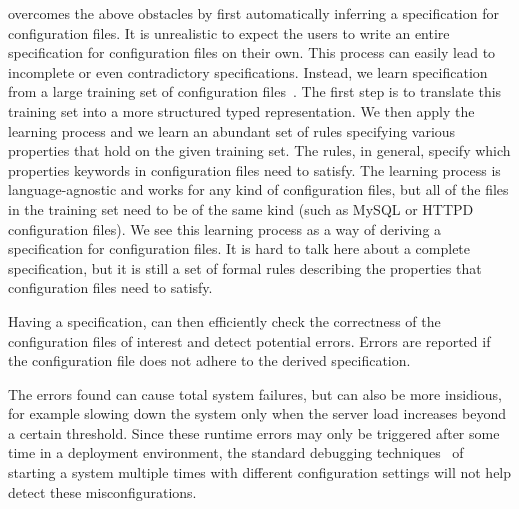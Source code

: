 \app overcomes the above obstacles by first automatically inferring a
specification for configuration files. It is unrealistic to expect the 
users to write an entire specification for configuration files on their own. 
This process can easily lead to incomplete or even contradictory 
specifications. Instead, we learn specification from 
a large training set of 
configuration files~\cite{configdataset}. The first step is to 
translate this training set into a more structured typed representation.
We then apply the learning process and we learn an abundant set of rules 
specifying various properties that hold on the given training set. The rules, in general, 
specify which properties keywords in configuration files need to satisfy.
The learning process is language-agnostic and works for any kind 
of configuration files,  but all of the files in the training set need to be of 
the same kind (such as MySQL or HTTPD configuration files).
We see this learning process as 
a way of deriving  a specification for configuration files. 
It is hard to talk here about a complete specification, but it is still
a set of formal rules describing the properties that configuration files need to satisfy. 

Having a specification, \app can then efficiently check 
the correctness of the configuration files of interest and detect 
potential errors. Errors are reported if the configuration file does not 
adhere to the derived specification.

The errors found can cause total system failures, but can also be more insidious, for example slowing down the system only when the server load increases beyond a certain threshold.
Since these runtime errors may only be triggered after some time in a deployment environment, the standard debugging 
techniques~\cite{Zeller:2005:WPF:1077048} of starting a system multiple times with different configuration settings will not help detect these misconfigurations.


